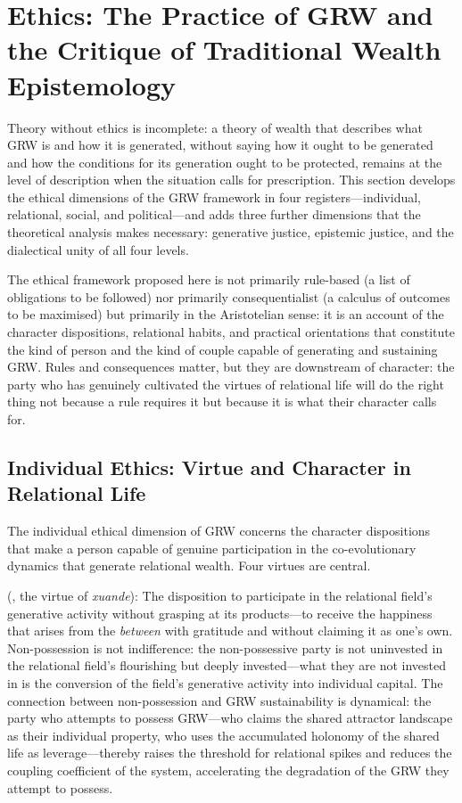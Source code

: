 \section{Ethics: The Practice of GRW and the Critique of Traditional Wealth Epistemology}
\label{p15:sec:ethics}

\noindent
Theory without ethics is incomplete: a theory of wealth that describes what GRW is and how it is generated, without saying how it ought to be generated and how the conditions for its generation ought to be protected, remains at the level of description when the situation calls for prescription. This section develops the ethical dimensions of the GRW framework in four registers---individual, relational, social, and political---and adds three further dimensions that the theoretical analysis makes necessary: generative justice, epistemic justice, and the dialectical unity of all four levels.

The ethical framework proposed here is not primarily rule-based (a list of obligations to be followed) nor primarily consequentialist (a calculus of outcomes to be maximised) but primarily  in the Aristotelian sense: it is an account of the character dispositions, relational habits, and practical orientations that constitute the kind of person and the kind of couple capable of generating and sustaining GRW. Rules and consequences matter, but they are downstream of character: the party who has genuinely cultivated the virtues of relational life will do the right thing not because a rule requires it but because it is what their character calls for.

\subsection{Individual Ethics: Virtue and Character in Relational Life}
\label{p15:subsec:individual_ethics}

\noindent
The individual ethical dimension of GRW concerns the character dispositions that make a person capable of genuine participation in the co-evolutionary dynamics that generate relational wealth. Four virtues are central.

 (, the virtue of \emph{xuande}): The disposition to participate in the relational field's generative activity without grasping at its products---to receive the happiness that arises from the \emph{between} with gratitude and without claiming it as one's own. Non-possession is not indifference: the non-possessive party is not uninvested in the relational field's flourishing but deeply invested---what they are not invested in is the conversion of the field's generative activity into individual capital. The connection between non-possession and GRW sustainability is dynamical: the party who attempts to possess GRW---who claims the shared attractor landscape as their individual property, who uses the accumulated holonomy of the shared life as leverage---thereby raises the threshold for relational spikes and reduces the coupling coefficient of the system, accelerating the degradation of the GRW they attempt to possess.

